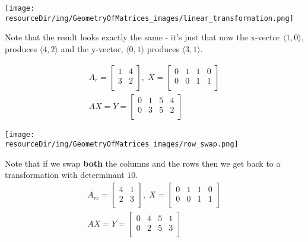 \documentclass[../MathsNotesBase.tex]{subfiles}
\begin{document}
{		\begin{center}
		\texttt{[image: \\resourceDir/img/GeometryOfMatrices\_images/linear\_transformation.png]}
		\end{center}
		
		Note that the result looks exactly the same - it's just that now the x-vector $\langle 1, 0 \rangle$, produces $\langle 4, 2 \rangle$ and the y-vector, $\langle 0, 1 \rangle$ produces $\langle 3, 1 \rangle$.
			
		\begin{align*}
		A_r =
		\begin{bmatrix}    
		1  &   4 \\
		3  &   2 \\		
		\end{bmatrix}
		,\; X = 
		\begin{bmatrix}  
		0   &  1  &   1  &   0 \\
		0   &  0  &   1  &   1	\\	
		\end{bmatrix} \\[10pt]
		AX = Y = 
		\begin{bmatrix}   
		0  &   1  &   5  &   4 \\
		0  &   3  &   5  &   2	\\
		\end{bmatrix}
		\end{align*}
		
		\begin{center}
		\texttt{[image: \\resourceDir/img/GeometryOfMatrices\_images/row\_swap.png]}
		\end{center}
		
		Note that if we swap \textbf{both} the columns and the rows then we get back to a transformation with determinant $10$.
		\begin{align*}
		A_{rc} =
		\begin{bmatrix}    
		4  &   1 \\
		2  &   3 \\		
		\end{bmatrix}
		,\; X = 
		\begin{bmatrix}  
		0   &  1  &   1  &   0 \\
		0   &  0  &   1  &   1	\\	
		\end{bmatrix} \\[10pt]
		AX = Y = 
		\begin{bmatrix}   
		0  &   4  &   5  &   1 \\
		0  &   2  &   5  &   3	\\
		\end{bmatrix}
		\end{align*}
		
}
\end{document}

